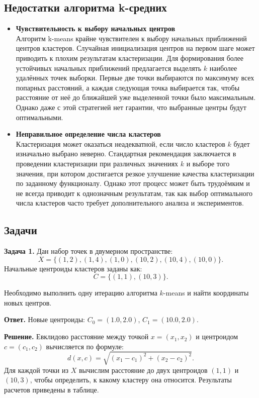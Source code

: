 \subsection{Недостатки алгоритма k-средних}
\begin{itemize}
    \item \textbf{Чувствительность к выбору начальных центров} \\
    Алгоритм k-means крайне чувствителен к выбору начальных приближений центров кластеров. Случайная инициализация центров на первом шаге может приводить к плохим результатам кластеризации. Для формирования более устойчивых начальных приближений предлагается выделять \( k \) наиболее удалённых точек выборки. Первые две точки выбираются по максимуму всех попарных расстояний, а каждая следующая точка выбирается так, чтобы расстояние от неё до ближайшей уже выделенной точки было максимальным. Однако даже с этой стратегией нет гарантии, что выбранные центры будут оптимальными.
    \item \textbf{Неправильное определение числа кластеров} \\
    Кластеризация может оказаться неадекватной, если число кластеров \( k \) будет изначально выбрано неверно. Стандартная рекомендация заключается в проведении кластеризации при различных значениях \( k \) и выборе того значения, при котором достигается резкое улучшение качества кластеризации по заданному функционалу. Однако этот процесс может быть трудоёмким и не всегда приводит к однозначным результатам, так как выбор оптимального числа кластеров часто требует дополнительного анализа и экспериментов.
\end{itemize}

\subsection{Задачи}
\textbf{Задача 1.} Дан набор точек в двумерном пространстве:
\[
X = \{(1, 2), (1, 4), (1, 0), (10, 2), (10, 4), (10, 0)\}.
\]
Начальные центроиды кластеров заданы как:
\[
C = \{(1, 1), (10, 3)\}.
\]

Необходимо выполнить одну итерацию алгоритма \(k\)-means и найти координаты новых центров.

\textbf{Ответ. }Новые центроиды: \(C_0 = (1.0, 2.0)\), \(C_1 = (10.0, 2.0)\).

\textbf{Решение.}
Евклидово расстояние между точкой \(x = (x_1, x_2)\) и центроидом \(c = (c_1, c_2)\) вычисляется по формуле:
\[
d(x, c) = \sqrt{(x_1 - c_1)^2 + (x_2 - c_2)^2}.
\]
Для каждой точки из \(X\) вычислим расстояние до двух центроидов \((1, 1)\) и \((10, 3)\), чтобы определить, к какому кластеру она относится. Результаты расчетов приведены в таблице.

